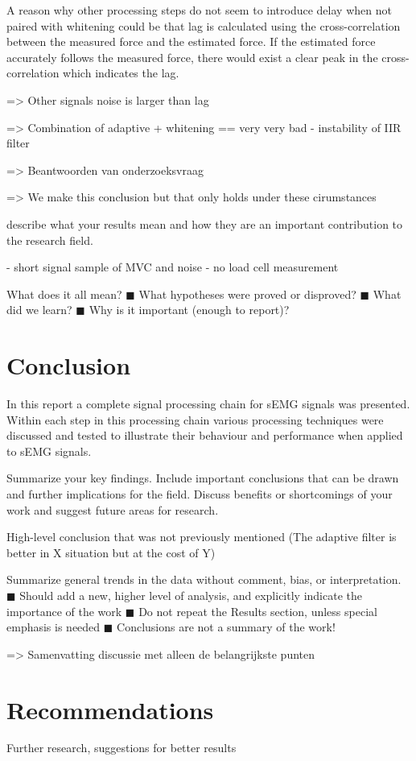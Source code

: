 A reason why other processing steps do not seem to introduce delay when not paired with whitening could be that lag is calculated using the cross-correlation between the measured force and the estimated force. If the estimated force accurately follows the measured force, there would exist a clear peak in the cross-correlation which indicates the lag.




=> Other signals noise is larger than lag 


=> Combination of adaptive + whitening == very very bad
- instability of IIR filter

=> Beantwoorden van onderzoeksvraag

=> We make this conclusion but that only holds under these cirumstances

describe what your results mean and how they are an important contribution to the research field.

- short signal sample of MVC and noise
- no load cell measurement


What does it all mean?
◼ What hypotheses were proved or disproved?
◼ What did we learn?
◼ Why is it important (enough to report)?
\section{Conclusion}
In this report a complete signal processing chain for sEMG signals was presented. Within each step in this processing chain various processing techniques were discussed and tested to illustrate their behaviour and performance when applied to sEMG signals. 



Summarize your key findings. Include important conclusions that can be drawn and further implications for the field. Discuss benefits or shortcomings of your work and suggest future areas for research.

High-level conclusion that was not previously mentioned (The adaptive filter is better in X situation but at the cost of Y)

Summarize general trends in the data without comment, bias, or interpretation.
◼ Should add a new, higher level of analysis, and explicitly indicate the importance
of the work
◼ Do not repeat the Results section, unless special emphasis is needed
◼ Conclusions are not a summary of the work!

=> Samenvatting discussie met alleen de belangrijkste punten

\section{Recommendations}
Further research, suggestions for better results